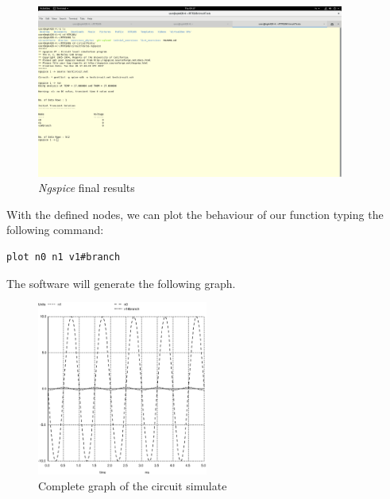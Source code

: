 \documentclass{article}
\begin{document}
\begin{figure}[H]
\centering
\includegraphics[width=0.9\textwidth, height=0.9\textwidth, angle =0]{finalResults}
\caption{\textit{Ngspice} final results}
\end{figure}

With the defined nodes, we can plot the behaviour of our function typing the following command: \break

\begin{lstlisting}
plot n0 n1 v1#branch
\end{lstlisting} 

The software will generate the following graph.

\begin{figure}[H]
\centering
\includegraphics[width=0.5\textwidth, height=0.5\textwidth, angle =0]{011}
\caption{Complete graph of the circuit simulate}
\end{figure}
\end{document}
